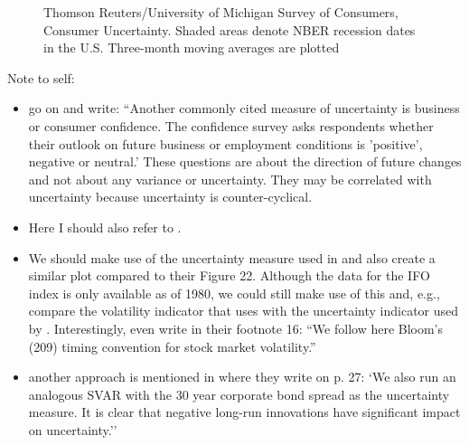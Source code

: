 \documentclass[a4paper,11pt,listof=nochaptergap,oneside,pointednumbers,bibtotoc,bigheadings,liststotoc]{scrbook}
\begin{document}
\begin{figure}[!h]
   \centering
   \setlength\fboxsep{0pt}
   \setlength\fboxrule{0pt}
      \caption[Thomson Reuters/University of Michigan Survey of Consumers, Consumer Uncertainty.]{Thomson Reuters/University of Michigan Survey of Consumers, Consumer Uncertainty. Shaded areas denote NBER recession dates in the U.S. Three-month moving averages are plotted}   \label{fig:michigan_plot}
\end{figure}

\begingroup
    \fontsize{8pt}{12pt}\selectfont
    Note to self:
\begin{itemize}
	\item \citet{orlikandveldkamp:14} go on and write: ``Another commonly cited measure of uncertainty is business or consumer confidence. The confidence survey asks respondents whether their outlook on future business or employment conditions is 'positive', negative or neutral.' These questions are about the direction of future changes and not about any variance or uncertainty. They may be correlated with uncertainty because uncertainty is counter-cyclical.
	\item Here I should also refer to \citet{bachmannetal:13}.
	\item We should make use of the uncertainty measure used in \citet{bachmannetal:13} and also create a similar plot compared to their Figure 22. Although the data for the IFO index is only available as of 1980, we could still make use of this and, e.g., compare the volatility indicator that \citet{bloom:09} uses with the uncertainty indicator used by \citet{bachmannetal:13}. Interestingly, \citet{bachmannetal:13} even write in their footnote 16: ``We follow here Bloom's (209) timing convention for stock market volatility.''
	\item another approach is mentioned in \citet{bachmannetal:13} where they write on p. 27: `We also run an analogous SVAR with the 30 year corporate bond spread as the uncertainty measure. It is clear that negative long-run innovations have significant impact on uncertainty.''
\end{itemize}
\endgroup
\end{document}
